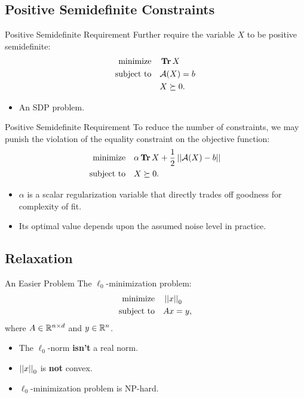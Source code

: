 \documentclass{beamer}
\begin{document}
\subsection{Positive Semidefinite Constraints}

\begin{frame}{Positive Semidefinite Requirement}
    Further require the variable \(X\) to be positive semidefinite:
    \[\begin{aligned}
        \textnormal{minimize}\quad & \operatorname{\mathbf{Tr}} X\\
        \textnormal{subject to}\quad & \mathcal A(X)=b\\
        & X\succeq 0.
    \end{aligned}\]
    \begin{itemize}
        \item An SDP problem.
    \end{itemize}
\end{frame}

\begin{frame}{Positive Semidefinite Requirement}
    To reduce the number of constraints, we may punish the violation of the equality constraint on the objective function:
    \[\begin{aligned}
        \textnormal{minimize}\quad & \alpha\operatorname{\mathbf{Tr}} X+\frac12\left|\left|\mathcal A(X)-b\right|\right|\\
        \textnormal{subject to}\quad & X\succeq 0.
    \end{aligned}\]
    \begin{itemize}
        \item \(\alpha\) is a scalar regularization variable that directly trades off goodness for complexity of fit.
        \item Its optimal value depends upon the assumed noise level in practice.
    \end{itemize}
\end{frame}

\subsection{Relaxation}

\begin{frame}{An Easier Problem}
    The \(\ell_0\)-minimization problem:
    \[\begin{aligned}
        \textnormal{minimize}\quad & \left|\left|x\right|\right|_0\\
        \textnormal{subject to}\quad & Ax=y,
    \end{aligned}\]
    where \(A\in\mathbb R^{n\times d}\) and \(y\in\mathbb R^n\).
    \begin{itemize}
        \item The \(\ell_0\)-norm \textbf{isn't} a real norm.
        \item \(\left|\left|x\right|\right|_0\) is \textbf{not} convex.
        \item \(\ell_0\)-minimization problem is NP-hard.
    \end{itemize}
\end{frame}
\end{document}
